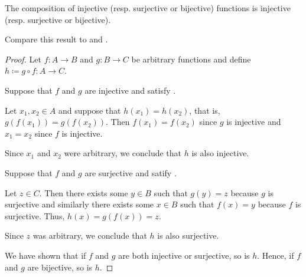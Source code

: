 \begin{proposition}\label{thm:function_composition_invertibility}
  The composition of injective (resp. surjective or bijective) functions is injective (resp. surjective or bijective).
\end{proposition}
\begin{comments}
  \item Compare this result to  and .
\end{comments}
\begin{proof}
  Let \( f: A \to B \) and \( g: B \to C \) be arbitrary functions and define \( h \coloneqq g \circ f: A \to C \).

   Suppose that \( f \) and \( g \) are injective and satisfy .

  Let \( x_1, x_2 \in A \) and suppose that \( h(x_1) = h(x_2) \), that is, \( g(f(x_1)) = g(f(x_2)) \). Then \( f(x_1) = f(x_2) \) since \( g \) is injective and \( x_1 = x_2 \) since \( f \) is injective.

  Since \( x_1 \) and \( x_2 \) were arbitrary, we conclude that \( h \) is also injective.

   Suppose that \( f \) and \( g \) are surjective and satify .

  Let \( z \in C \). Then there exists some \( y \in B \) such that \( g(y) = z \) because \( g \) is surjective and similarly there exists some \( x \in B \) such that \( f(x) = y \) because \( f \) is surjective. Thus, \( h(x) = g(f(x)) = z \).

  Since \( z \) was arbitrary, we conclude that \( h \) is also surjective.

   We have shown that if \( f \) and \( g \) are both injective or surjective, so is \( h \). Hence, if \( f \) and \( g \) are bijective, so is \( h \).
\end{proof}

